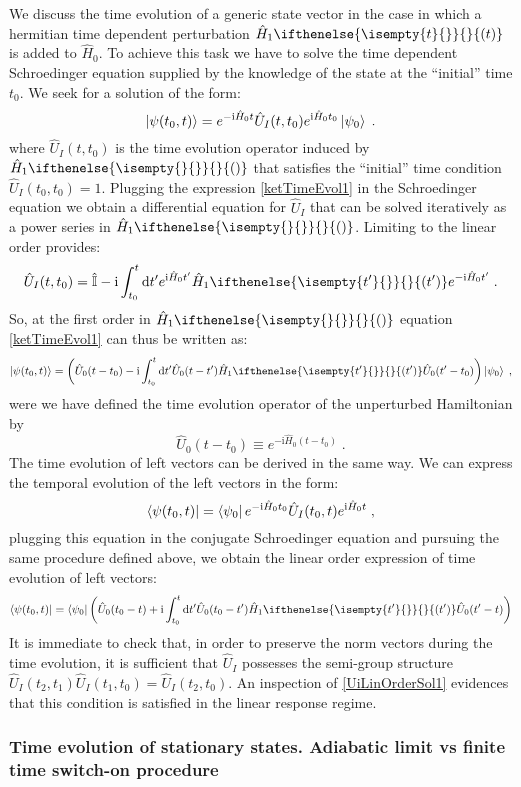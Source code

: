 \documentclass[a4paper]{article}
\newcommand{\dd}{{\rm d}}
\newcommand{\ii}{\mathrm{i}}
\newcommand{\intdef}[3]{\int_{#1}^{#2} \dd {#3}}
\newcommand{\be}{\begin{equation}}
\newcommand{\ee}{\end{equation}}
\newcommand{\lb}{\label}
\newcommand{\op}[1]{\hat {#1}}
\newcommand{\argument}[1]{\ifthenelse{\isempty{#1}{}}{}{(#1)}}
\newcommand{\hnot}{\op{H}_0}
\newcommand{\hone}[1]{\op{H}_1\argument{#1}}
\newcommand{\identity}{\op{\mathbb I}}
\begin{document}
We discuss the time evolution of a generic state vector in the case in which a hermitian time dependent perturbation $\hone{t}$ is added to $\hnot$. 
To achieve this task we have to solve the time dependent Schroedinger equation supplied by the knowledge of the state at the ``initial'' time $t_0$.
We seek for a solution of the form:
\be\lb{ketTimeEvol1}
\ket{\psi(t_{0},t)} = e^{-\ii \hnot t} \op{U}_{I}(t,t_0) e^{\ii \hnot t_0}\ket{\psi_0} \; . 
\ee
where $\op{U}_I(t,t_0)$ is the time evolution operator induced by $\hone{}$ that satisfies the ``initial'' time condition $\op{U}_I(t_0,t_0)=1$. 
Plugging the expression \eqref{ketTimeEvol1} in the Schroedinger equation we obtain a differential equation for $\op{U}_I$ that can be solved 
iteratively as a power series in $\hone{}$. Limiting to the linear order provides:
\be \lb{UiLinOrderSol1}
\op{U}_I(t,t_0) = \identity - \ii \intdef{t_0}{t}{t'} e^{\ii \hnot t'} \hone{t'} e^{-\ii \hnot t'} \; .
\ee
So, at the first order in $\hone{}$ equation \eqref{ketTimeEvol1} can thus be written as:
\be \lb{ketTimeEvol2} 
\ket{\psi(t_{0},t)} = \left( \op{U}_0(t-t_0) - \ii \intdef{t_0}{t}{t'} \op{U}_0(t-t') \hone{t'} 
\op{U}_0(t'-t_0) \right)\ket{\psi_0} \; ,
\ee
were we have defined the time evolution operator of the unperturbed Hamiltonian by
\be
\op{U}_0(t-t_0)\equiv e^{-\ii \hnot(t -t_0)} \;.
\ee
The time evolution of left vectors can be derived in the same way. We can express the temporal evolution of the left 
vectors in the form:
\be \lb{braTimeEvol1}
\bra{\psi(t_{0},t)} = \bra{\psi_0} e^{-\ii \hnot t_0} \op{U}_{I}(t_0,t) e^{\ii \hnot t} \;,
\ee
plugging this equation in the conjugate Schroedinger equation and pursuing the same procedure defined above, we obtain the 
linear order expression of time evolution of left vectors:
\be\lb{leftVectTimeEvol2}
\bra{\psi(t_{0},t)} = \bra{\psi_0} \left( \op{U}_0(t_0-t) + \ii \intdef{t_0}{t}{t'} \op{U}_0(t_0-t') 
\hone{t'} \op{U}_0(t'-t) \right) 
\ee
It is immediate to check that, in order to preserve the norm vectors during the time evolution, it is sufficient that $\op{U}_I$ 
possesses the  semi-group structure $\op{U}_I(t_2,t_1) \op{U}_I(t_1,t_0) = \op{U}_I(t_2,t_0)$. An inspection of \eqref{UiLinOrderSol1}
evidences that this condition is satisfied in the linear response regime.


\subsubsection{Time evolution of stationary states. Adiabatic limit vs finite time switch-on procedure}
\end{document}
